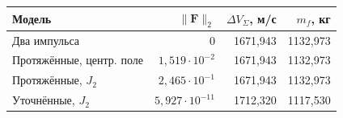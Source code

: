 \begin{tabular}{@{}lrrr@{}}
\toprule
Модель & $\|\mathbf F\|_2$ & $\Delta V_\Sigma$, м/с & $m_f$, кг \\
\midrule
Два импульса & $0$ & 1671{,}943 & 1132{,}973 \\
Протяжённые, центр. поле & $1{,}519\cdot10^{-2}$ & 1671{,}943 & 1132{,}973 \\
Протяжённые, $J_2$ & $2{,}465\cdot10^{-1}$ & 1671{,}943 & 1132{,}973 \\
Уточнённые, $J_2$ & $5{,}927\cdot10^{-11}$ & 1712{,}320 & 1117{,}530 \\
\bottomrule
\end{tabular}
